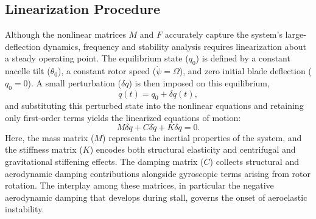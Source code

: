 \documentclass[final,onecolumn]{IEEEtran}
\begin{document}
\subsection{Linearization Procedure}
Although the nonlinear matrices $M$ and $F$ accurately capture the system's large-deflection dynamics, frequency and stability analysis requires linearization about a steady operating point. The equilibrium state ($q_0$) is defined by a constant nacelle tilt ($\theta_0$), a constant rotor speed ($\dot{\psi} = \Omega$), and zero initial blade deflection ($q_0 = 0$). A small perturbation ($\delta q$) is then imposed on this equilibrium,
\begin{equation}
    q(t) = q_0 + \delta q(t),
\end{equation}
and substituting this perturbed state into the nonlinear equations and retaining only first-order terms yields the linearized equations of motion:
\begin{equation}
    M\delta\ddot{q} + C\delta\dot{q} + K\delta q = 0.
\end{equation}
Here, the mass matrix ($M$) represents the inertial properties of the system, and the stiffness matrix ($K$) encodes both structural elasticity and centrifugal and gravitational stiffening effects. The damping matrix ($C$) collects structural and aerodynamic damping contributions alongside gyroscopic terms arising from rotor rotation. The interplay among these matrices, in particular the negative aerodynamic damping that develops during stall, governs the onset of aeroelastic instability.
\end{document}
